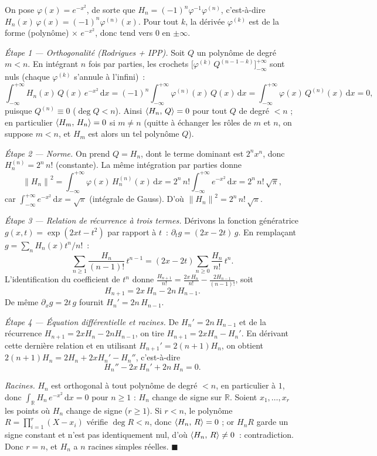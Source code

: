 \begin{mdframed}[style=proofbar]
  On pose $\varphi(x)=e^{-x^2}$, de sorte que
  $H_n=(-1)^n\varphi^{-1}\varphi^{(n)}$, c'est-à-dire
  $H_n(x)\,\varphi(x)=(-1)^n\varphi^{(n)}(x)$. Pour tout $k$, la dérivée
  $\varphi^{(k)}$ est de la forme (polynôme)$\,\times\,e^{-x^2}$, donc
  tend vers $0$ en $\pm\infty$.

  \medskip
  \textit{Étape 1 — Orthogonalité (Rodrigues + IPP).}
  Soit $Q$ un polynôme de degré $m<n$. En intégrant $n$ fois par parties,
  les crochets $\bigl[\varphi^{(k)}\,Q^{(n-1-k)}\bigr]_{-\infty}^{+\infty}$
  sont nuls (chaque $\varphi^{(k)}$ s'annule à l'infini)~:
  \[
    \int_{-\infty}^{+\infty} H_n(x)\,Q(x)\,e^{-x^2}\,\mathrm{d}x
    = {(-1)}^n\int_{-\infty}^{+\infty} \varphi^{(n)}(x)\,Q(x)\,\mathrm{d}x
    = \int_{-\infty}^{+\infty} \varphi(x)\,Q^{(n)}(x)\,\mathrm{d}x = 0,
  \]
  puisque $Q^{(n)}\equiv 0$ ($\deg Q<n$). Ainsi $\langle H_n,\,Q\rangle=0$ pour
  tout $Q$ de degré $<n$ ; en particulier $\langle H_m,\,H_n\rangle=0$ si $m\neq n$
  (quitte à échanger les rôles de $m$ et $n$, on suppose $m<n$, et $H_m$
  est alors un tel polynôme $Q$).

  \medskip
  \textit{Étape 2 — Norme.} On prend $Q=H_n$, dont le terme dominant est
  $2^n x^n$, donc $H_n^{(n)}=2^n\,n!$ (constante). La même intégration par
  parties donne
  \[
    {\|H_n\|}^2 = \int_{-\infty}^{+\infty} \varphi(x)\,H_n^{(n)}(x)\,\mathrm{d}x
    = 2^n\,n!\int_{-\infty}^{+\infty} e^{-x^2}\,\mathrm{d}x
    = 2^n\,n!\,\sqrt{\pi},
  \]
  car $\int_{-\infty}^{+\infty}e^{-x^2}\,\mathrm{d}x=\sqrt{\pi}$ (intégrale
  de Gauss). D'où ${\|H_n\|}^2 = 2^n\,n!\,\sqrt{\pi}$.

  \medskip
  \textit{Étape 3 — Relation de récurrence à trois termes.}
  Dérivons la fonction génératrice $g(x,t)=\exp(2xt-t^2)$ par rapport à
  $t$~: $\partial_t g=(2x-2t)\,g$. En remplaçant $g=\sum_n H_n(x)t^n/n!$~:
  \[
    \sum_{n\geq 1}\frac{H_n}{(n-1)!}\,t^{n-1}
    = (2x-2t)\sum_{n\geq 0}\frac{H_n}{n!}\,t^n.
  \]
  L'identification du coefficient de $t^n$ donne
  $\frac{H_{n+1}}{n!}=\frac{2x\,H_n}{n!}-\frac{2H_{n-1}}{(n-1)!}$, soit
  \[
    H_{n+1}=2x\,H_n-2n\,H_{n-1}.
  \]
  De même $\partial_x g=2t\,g$ fournit $H_n'=2n\,H_{n-1}$.

  \medskip
  \textit{Étape 4 — Équation différentielle et racines.}
  De $H_n'=2n\,H_{n-1}$ et de la récurrence $H_{n+1}=2xH_n-2nH_{n-1}$, on
  tire $H_{n+1}=2xH_n-H_n'$. En dérivant cette dernière relation et en
  utilisant $H_{n+1}'=2(n+1)H_n$, on obtient
  $2(n+1)H_n=2H_n+2xH_n'-H_n''$, c'est-à-dire
  \[
    H_n''-2x\,H_n'+2n\,H_n=0.
  \]

  \smallskip
  \emph{Racines.} $H_n$ est orthogonal à tout polynôme de degré $<n$, en
  particulier à $1$, donc $\int_{\mathbb{R}} H_n\,e^{-x^2}\,\mathrm{d}x=0$
  pour $n\geq 1$ : $H_n$ change de signe sur $\mathbb{R}$. Soient
  $x_1,\ldots,x_r$ les points où $H_n$ change de signe ($r\geq 1$). Si
  $r<n$, le polynôme $R=\prod_{i=1}^r(X-x_i)$ vérifie $\deg R<n$, donc
  $\langle H_n,\,R\rangle=0$ ; or $H_n R$ garde un signe constant et n'est pas
  identiquement nul, d'où $\langle H_n,\,R\rangle\neq 0$~: contradiction. Donc
  $r=n$, et $H_n$ a $n$ racines simples réelles.
  \hfill$\blacksquare$
\end{mdframed}

